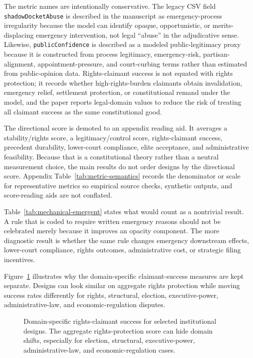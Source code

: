 \documentclass[
    journal=jlc,
    manuscript=research-article,
    year=2026,
  ]{cup-journal}
\providecommand{\Description}[1]{}
\begin{document}
The metric names are intentionally conservative. The legacy CSV field \texttt{shadowDocketAbuse} is described in the manuscript as emergency-process irregularity because the model can identify opaque, opportunistic, or merits-displacing emergency intervention, not legal ``abuse'' in the adjudicative sense. Likewise, \texttt{publicConfidence} is described as a modeled public-legitimacy proxy because it is constructed from process legitimacy, emergency-risk, partisan-alignment, appointment-pressure, and court-curbing terms rather than estimated from public-opinion data. Rights-claimant success is not equated with rights protection; it records whether high-rights-burden claimants obtain invalidation, emergency relief, settlement protection, or constitutional remand under the model, and the paper reports legal-domain values to reduce the risk of treating all claimant success as the same constitutional good.

The directional score is demoted to an appendix reading aid. It averages a stability/rights score, a legitimacy/control score, rights-claimant success, precedent durability, lower-court compliance, elite acceptance, and administrative feasibility. Because that is a constitutional theory rather than a neutral measurement choice, the main results do not order designs by the directional score. Appendix Table~\ref{tab:metric-semantics} records the denominator or scale for representative metrics so empirical source checks, synthetic outputs, and score-reading aids are not conflated.



Table~\ref{tab:mechanical-emergent} states what would count as a nontrivial result. A rule that is coded to require written emergency reasons should not be celebrated merely because it improves an opacity component. The more diagnostic result is whether the same rule changes emergency downstream effects, lower-court compliance, rights outcomes, administrative cost, or strategic filing incentives.

Figure~\ref{fig:domain-claimant-success} illustrates why the domain-specific claimant-success measures are kept separate. Designs can look similar on aggregate rights protection while moving success rates differently for rights, structural, election, executive-power, administrative-law, and economic-regulation disputes.

\begin{figure}[hbt!]
\centering

\caption{Domain-specific rights-claimant success for selected institutional designs. The aggregate rights-protection score can hide domain shifts, especially for election, structural, executive-power, administrative-law, and economic-regulation cases.}
\Description{Heatmap comparing claimant-success rates by legal domain across selected court designs.}
\label{fig:domain-claimant-success}
\end{figure}
\end{document}
